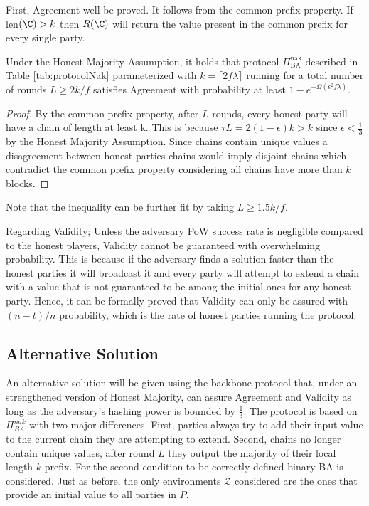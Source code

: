 \documentclass[..]{subfiles}
\begin{document}
First, Agreement well be proved. It follows from the common prefix property. If len$(\C) > k$ then $R(\C)$ will return the value present in the common prefix for every single party.
\begin{lemma}[Agreement]
	Under the Honest Majority Assumption, it holds that protocol $\Pi_{\textrm{BA}}^{\textrm{nak}}$ described in Table \ref{tab:protocolNak} parameterized with $k=\lceil 2f\lambda \rceil$ running for a total number of rounds $L \ge 2k/f$ satisfies Agreement with probability at least $1 - e^{- \Omega(\epsilon^2 f \lambda)}$.
\end{lemma}
\begin{proof}
	By the common prefix property, after $L$ rounds, every honest party will have a chain of length at least k. This is because $\tau L = 2(1 - \epsilon) k > k$ since $\epsilon < \frac{1}{3}$ by the Honest Majority Assumption.
	Since chains contain unique values a disagreement between honest parties chains would imply disjoint chains which contradict the common prefix property considering all chains have more than $k$ blocks.
\end{proof}
Note that the inequality can be further fit by taking $L \ge 1.5k/f$.

Regarding Validity; Unless the adversary PoW success rate is negligible compared to the honest players, Validity cannot be guaranteed with overwhelming probability. This is because if the adversary finds a solution faster than the honest parties it will broadcast it and every party will attempt to extend a chain with a value that is not guaranteed to be among the initial ones for any honest party. Hence, it can be formally proved that Validity can only be assured with $(n-t)/n$ probability, which is the rate of honest parties running the protocol.



\subsection{Alternative Solution}

An alternative solution will be given using the backbone protocol that, under an strengthened version of Honest Majority, can assure Agreement and Validity as long as the adversary's hashing power is bounded by $\frac{1}{3}$. The protocol is based on $\Pi_{BA}^{nak}$ with two major differences. First, parties always try to add their input value to the current chain they are attempting to extend. Second, chains no longer contain unique values, after round $L$ they output the majority of their local length $k$ prefix. For the second condition to be correctly defined binary BA is considered. Just as before, the only environments $\mathcal{Z}$ considered are the ones that provide an initial value to all parties in $P$.
\end{document}
